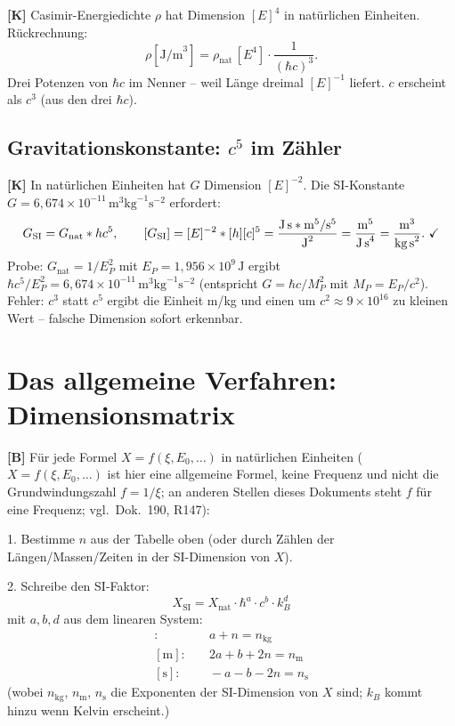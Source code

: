 \textbf{[K]} Casimir-Energiedichte $\rho$ hat Dimension $[E]^4$ in natürlichen
Einheiten. Rückrechnung:
\[
  \rho[\text{J/m}^3]
  = \rho_\text{nat}\,[E^4]\cdot\frac{1}{(\hbar c)^3}.
\]
Drei Potenzen von $\hbar c$ im Nenner -- weil Länge dreimal $[E]^{-1}$ liefert.
$c$ erscheint als $c^3$ (aus den drei $\hbar c$).

\subsection{Gravitationskonstante: $c^5$ im Zähler}

\textbf{[K]} In natürlichen Einheiten hat $G$ Dimension $[E]^{-2}$. Die
SI-Konstante $G=6{,}674\times10^{-11}\,\text{m}^3\text{kg}^{-1}\text{s}^{-2}$
erfordert:
\[
  G_\text{SI} = G_\text{nat}\cdot\hbar c^5,
  \qquad
  [G_\text{SI}] = [E]^{-2}\cdot[\hbar][c]^5
  = \frac{\text{J\,s}\cdot\text{m}^5/\text{s}^5}{\text{J}^2}
  = \frac{\text{m}^5}{\text{J\,s}^4}
  = \frac{\text{m}^3}{\text{kg\,s}^2}.\ \checkmark
\]
Probe: $G_\text{nat}=1/E_P^2$ mit $E_P=1{,}956\times10^9\,\text{J}$ ergibt
$\hbar c^5/E_P^2=6{,}674\times10^{-11}\,\text{m}^3\text{kg}^{-1}\text{s}^{-2}$
(entspricht $G=\hbar c/M_P^2$ mit $M_P=E_P/c^2$).
Fehler: $c^3$ statt $c^5$ ergibt die Einheit m/kg und einen um $c^2\approx9\times10^{16}$
zu kleinen Wert -- falsche Dimension sofort erkennbar.

\section{Das allgemeine Verfahren: Dimensionsmatrix}

\textbf{[B]} Für jede Formel $X=f(\xi,E_0,\ldots)$ in natürlichen Einheiten ($X = f(\xi, E_0, \ldots)$ ist hier eine allgemeine Formel, keine Frequenz und nicht die Grundwindungszahl $f = 1/\xi$; an anderen Stellen dieses Dokuments steht $f$ für eine Frequenz; vgl.\ Dok.~190, R147):

1. Bestimme $n$ aus der Tabelle oben (oder durch Zählen der
   Längen/Massen/Zeiten in der SI-Dimension von $X$).

2. Schreibe den SI-Faktor:
\[
  X_\text{SI} = X_\text{nat}\cdot\hbar^a\cdot c^b\cdot k_B^d
\]
mit $a,b,d$ aus dem linearen System:
\begin{align*}
  [\text{kg}]:&\quad a+n = n_\text{kg} \\
  [\text{m}]:&\quad 2a+b+2n = n_\text{m} \\
  [\text{s}]:&\quad -a-b-2n = n_\text{s}
\end{align*}
(wobei $n_\text{kg}$, $n_\text{m}$, $n_\text{s}$ die Exponenten der SI-Dimension
von $X$ sind; $k_B$ kommt hinzu wenn Kelvin erscheint.)

